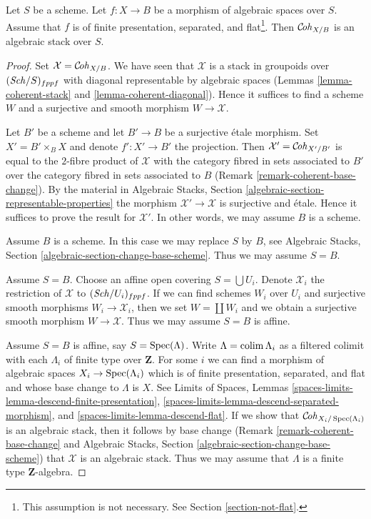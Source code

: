 \begin{theorem}
\label{theorem-coherent-algebraic}
Let $S$ be a scheme. Let $f : X \to B$ be a morphism of algebraic spaces
over $S$. Assume that $f$ is of finite presentation, separated, and
flat\footnote{This assumption is not necessary. See
Section \ref{section-not-flat}.}. Then $\mathcal{C}\!\mathit{oh}_{X/B}$ is
an algebraic stack over $S$.
\end{theorem}

\begin{proof}
Set $\mathcal{X} = \mathcal{C}\!\mathit{oh}_{X/B}$. We have seen that $\mathcal{X}$
is a stack in groupoids over $(\mathit{Sch}/S)_{fppf}$ with diagonal representable
by algebraic spaces
(Lemmas \ref{lemma-coherent-stack} and \ref{lemma-coherent-diagonal}).
Hence it suffices to find a scheme $W$ and a surjective and smooth
morphism $W \to \mathcal{X}$.

\medskip\noindent
Let $B'$ be a scheme and let $B' \to B$ be a surjective \'etale morphism.
Set $X' = B' \times_B X$ and denote $f' : X' \to B'$ the projection.
Then $\mathcal{X}' = \mathcal{C}\!\mathit{oh}_{X'/B'}$ is equal to the $2$-fibre
product of $\mathcal{X}$ with the category fibred in sets
associated to $B'$ over the category fibred in sets associated to $B$
(Remark \ref{remark-coherent-base-change}). By the material in
Algebraic Stacks, Section \ref{algebraic-section-representable-properties}
the morphism $\mathcal{X}' \to \mathcal{X}$ is surjective and \'etale.
Hence it suffices to prove the result for $\mathcal{X}'$.
In other words, we may assume $B$ is a scheme.

\medskip\noindent
Assume $B$ is a scheme. In this case we may replace $S$ by $B$, see
Algebraic Stacks, Section \ref{algebraic-section-change-base-scheme}.
Thus we may assume $S = B$.

\medskip\noindent
Assume $S = B$. Choose an affine open covering $S = \bigcup U_i$.
Denote $\mathcal{X}_i$ the restriction of $\mathcal{X}$ to
$(\mathit{Sch}/U_i)_{fppf}$. If we can find schemes $W_i$ over $U_i$ and
surjective smooth morphisms $W_i \to \mathcal{X}_i$, then we
set $W = \coprod W_i$ and we obtain a surjective smooth morphism
$W \to \mathcal{X}$. Thus we may assume $S = B$ is affine.

\medskip\noindent
Assume $S = B$ is affine, say $S = \mathop{\mathrm{Spec}}(\Lambda)$.
Write $\Lambda = \mathop{\mathrm{colim}}\nolimits \Lambda_i$ as a filtered colimit with each $\Lambda_i$
of finite type over $\mathbf{Z}$. For some $i$ we can find
a morphism of algebraic spaces $X_i \to \mathop{\mathrm{Spec}}(\Lambda_i)$
which is of finite presentation, separated, and flat and whose base change
to $\Lambda$ is $X$. See
Limits of Spaces, Lemmas
\ref{spaces-limits-lemma-descend-finite-presentation},
\ref{spaces-limits-lemma-descend-separated-morphism}, and
\ref{spaces-limits-lemma-descend-flat}.
If we show that $\mathcal{C}\!\mathit{oh}_{X_i/\mathop{\mathrm{Spec}}(\Lambda_i)}$ is an
algebraic stack, then it follows by base change
(Remark \ref{remark-coherent-base-change} and
Algebraic Stacks, Section \ref{algebraic-section-change-base-scheme})
that $\mathcal{X}$ is an algebraic stack.
Thus we may assume that $\Lambda$ is a finite type $\mathbf{Z}$-algebra.


\end{proof}
